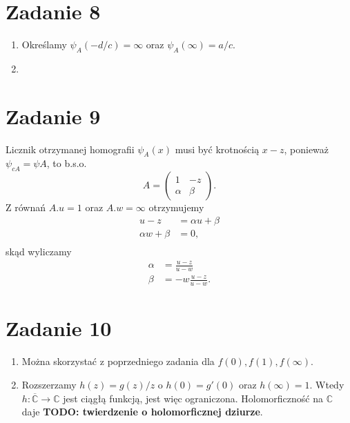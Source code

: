 \section*{Zadanie 8}

\begin{enumerate}
    \item
    Określamy \( \psi_A(-d/c) = \infty \) oraz \( \psi_A(\infty) = a/c \). 

    \item
\end{enumerate}

\section*{Zadanie 9}

Licznik otrzymanej homografii \( \psi_A(x) \) musi być krotnością \( x - z \), ponieważ \( \psi_{cA} = \psi{A} \), to b.s.o.
\[ 
    A =  
    \begin{pmatrix}
        1 & -z \\
        \alpha & \beta
    \end{pmatrix}.
\]
Z równań \( A.u = 1 \) oraz \( A.w = \infty \) otrzymujemy
\begin{align*}
    u - z &= \alpha u + \beta \\
    \alpha w + \beta &= 0, \\
\end{align*}
skąd wyliczamy
\begin{align*}
    \alpha &= \frac{u-z}{u - w} \\ 
    \beta &= -w\frac{u-z}{u-w}.
\end{align*}

\section*{Zadanie 10}

\begin{enumerate}
    \item Można skorzystać z poprzedniego zadania dla \( f(0), f(1), f(\infty) \).

    \item Rozszerzamy \( h(z) = g(z)/z \) o \( h(0) = g'(0) \) oraz \( h(\infty) = 1 \). Wtedy \( h: \overline{\mathbb{C}} \to \mathbb{C} \) jest ciągłą funkcją, jest więc ograniczona. Holomorficzność na \( \mathbb{C} \) daje \textbf{TODO: twierdzenie o holomorficznej dziurze}.
\end{enumerate}

